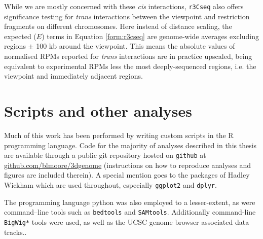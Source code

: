 \documentclass[a4paper,11pt,oneside]{book}
\begin{document}
While we are mostly concerned with these \emph{cis} interactions, \texttt{r3Cseq} also offers significance testing for \emph{trans} interactions between the viewpoint and restriction fragments on different chromosomes. Here instead of distance scaling, the expected ($E$) terms in Equation \ref{form:r3cseq} are genome-wide averages excluding regions $\pm$ 100 kb around the viewpoint.\cite{Thongjuea2013} This means the absolute values of normalised RPMs reported for \emph{trans} interactions are in practice upscaled, being equivalent to experimental RPMs less the most deeply-sequenced regions, i.e. the viewpoint and immediately adjacent regions.



\section{Scripts and other analyses}

Much of this work has been performed by writing custom scripts in the R programming language.\cite{Ihaka1996} Code for the majority of analyses described in this thesis are available through a public git repository hosted on \texttt{github} at \href{https://github.com/blmoore/3dgenome}{github.com/blmoore/3dgenome} (instructions on how to reproduce analyses and figures are included therein). A special mention goes to the packages of Hadley Wickham which are used throughout, especially \texttt{ggplot2}\cite{ggplot2} and \texttt{dplyr}\cite{dplyr}.

The programming language python\cite{rossum1995} was also employed to a lesser-extent, as were command--line tools such as \texttt{bedtools}\cite{Quinlan2010} and \texttt{SAMtools}\cite{Li2009}. Additionally command-line \texttt{BigWig*} tools\cite{Kent2010} were used, as well as the UCSC genome browser associated data tracks.\cite{Kent2002, Raney2014, Kuhn2013a}.

\ifstandalone
\begin{small}

\end{small}
\fi
\end{document}
